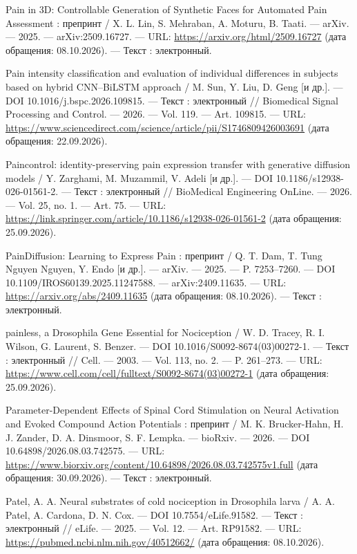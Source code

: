 \begin{list}{}{\setlength{\leftmargin}{10mm}\setlength{\labelwidth}{8mm}\setlength{\labelsep}{2mm}\setlength{\itemsep}{0pt}\setlength{\parsep}{0pt}\setlength{\topsep}{0pt}}
\item[220.] Pain in 3D: Controllable Generation of Synthetic Faces for Automated Pain Assessment : препринт / X. L. Lin, S. Mehraban, A. Moturu, B. Taati. — arXiv. — 2025. — arXiv:2509.16727. — URL: \url{https://arxiv.org/html/2509.16727} (дата обращения: 08.10.2026). — Текст : электронный.
\item[221.] Pain intensity classification and evaluation of individual differences in subjects based on hybrid CNN–BiLSTM approach / M. Sun, Y. Liu, D. Geng [и др.]. — DOI 10.1016/j.bspc.2026.109815. — Текст : электронный // Biomedical Signal Processing and Control. — 2026. — Vol. 119. — Art. 109815. — URL: \url{https://www.sciencedirect.com/science/article/pii/S1746809426003691} (дата обращения: 22.09.2026).
\item[222.] Paincontrol: identity-preserving pain expression transfer with generative diffusion models / Y. Zarghami, M. Muzammil, V. Adeli [и др.]. — DOI 10.1186/s12938-026-01561-2. — Текст : электронный // BioMedical Engineering OnLine. — 2026. — Vol. 25, no. 1. — Art. 75. — URL: \url{https://link.springer.com/article/10.1186/s12938-026-01561-2} (дата обращения: 25.09.2026).
\item[223.] PainDiffusion: Learning to Express Pain : препринт / Q. T. Dam, T. Tung Nguyen Nguyen, Y. Endo [и др.]. — arXiv. — 2025. — P. 7253–7260. — DOI 10.1109/IROS60139.2025.11247588. — arXiv:2409.11635. — URL: \url{https://arxiv.org/abs/2409.11635} (дата обращения: 08.10.2026). — Текст : электронный.
\item[224.] painless, a Drosophila Gene Essential for Nociception / W. D. Tracey, R. I. Wilson, G. Laurent, S. Benzer. — DOI 10.1016/S0092-8674(03)00272-1. — Текст : электронный // Cell. — 2003. — Vol. 113, no. 2. — P. 261–273. — URL: \url{https://www.cell.com/cell/fulltext/S0092-8674(03)00272-1} (дата обращения: 25.09.2026).
\item[225.] Parameter-Dependent Effects of Spinal Cord Stimulation on Neural Activation and Evoked Compound Action Potentials : препринт / M. K. Brucker-Hahn, H. J. Zander, D. A. Dinsmoor, S. F. Lempka. — bioRxiv. — 2026. — DOI 10.64898/2026.08.03.742575. — URL: \url{https://www.biorxiv.org/content/10.64898/2026.08.03.742575v1.full} (дата обращения: 30.09.2026). — Текст : электронный.
\item[226.] Patel, A. A. Neural substrates of cold nociception in Drosophila larva / A. A. Patel, A. Cardona, D. N. Cox. — DOI 10.7554/eLife.91582. — Текст : электронный // eLife. — 2025. — Vol. 12. — Art. RP91582. — URL: \url{https://pubmed.ncbi.nlm.nih.gov/40512662/} (дата обращения: 08.10.2026).

\end{list}
